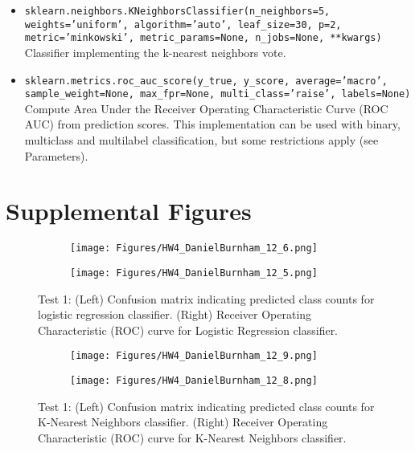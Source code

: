 \documentclass{article}
\begin{document}
\begin{appendices}
\begin{itemize}
    \item \texttt{sklearn.neighbors.KNeighborsClassifier(n\_neighbors=5, weights='uniform', algorithm='auto', leaf\_size=30, p=2, metric='minkowski', metric\_params=None, n\_jobs=None, **kwargs)}\\
    Classifier implementing the k-nearest neighbors vote.
    \item \texttt{sklearn.metrics.roc\_auc\_score(y\_true, y\_score, average='macro', sample\_weight=None, max\_fpr=None, multi\_class='raise', labels=None)}\\
    Compute Area Under the Receiver Operating Characteristic Curve (ROC AUC) from prediction scores. This implementation can be used with binary, multiclass and multilabel classification, but some restrictions apply (see Parameters).
    
\label{itemize:functions}
\end{itemize}

\newpage
\section{Supplemental Figures}
\begin{figure}[h]
\centering
   \begin{subfigure}{0.49\linewidth} \centering
     \texttt{[image: Figures/HW4\_DanielBurnham\_12\_6.png]}
   \end{subfigure}
   \begin{subfigure}{0.49\linewidth} \centering
     \texttt{[image: Figures/HW4\_DanielBurnham\_12\_5.png]}
   \end{subfigure}
\caption{Test 1: (Left) Confusion matrix indicating predicted class counts for logistic regression classifier. (Right) Receiver Operating Characteristic (ROC) curve for Logistic Regression classifier.} \label{fig:LRtest1}
\end{figure}

\begin{figure}[h]
\centering
   \begin{subfigure}{0.49\linewidth} \centering
     \texttt{[image: Figures/HW4\_DanielBurnham\_12\_9.png]}
   \end{subfigure}
   \begin{subfigure}{0.49\linewidth} \centering
     \texttt{[image: Figures/HW4\_DanielBurnham\_12\_8.png]}
   \end{subfigure}
\caption{Test 1: (Left) Confusion matrix indicating predicted class counts for K-Nearest Neighbors classifier. (Right) Receiver Operating Characteristic (ROC) curve for K-Nearest Neighbors classifier.} \label{fig:KNtest1}
\end{figure}


\end{appendices}
\end{document}
